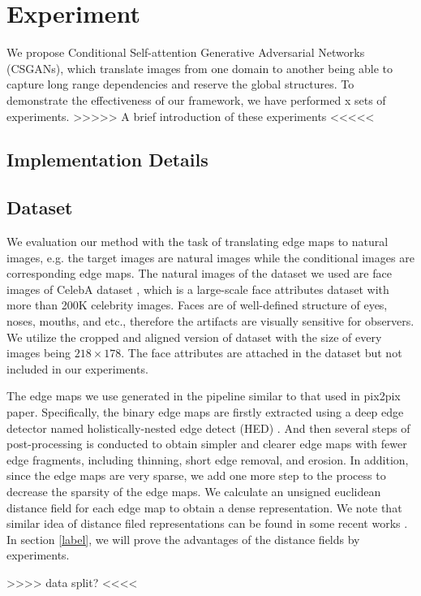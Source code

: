 \section{Experiment}
We propose Conditional Self-attention Generative Adversarial Networks (CSGANs), which translate images from one domain to another being able to capture long range dependencies and reserve the global structures. To demonstrate the effectiveness of our framework, we have performed x sets of experiments. >>>>> A brief introduction of these experiments <<<<< 
\subsection{Implementation Details}
\subsection{Dataset}
We evaluation our method with the task of translating edge maps to natural images, e.g. the target images are natural images while the conditional images are corresponding edge maps. The natural images of the dataset we used are face images of CelebA dataset \cite{CelebA}, which  is a large-scale face attributes dataset with more than 200K celebrity images. Faces are of well-defined structure of eyes, noses, mouths, and etc., therefore the artifacts are visually sensitive for observers. We utilize the cropped and aligned version of dataset with the size of every images being $218\times 178$. The face attributes are attached in the dataset but not included in our experiments. 

The edge maps we use generated in the pipeline similar to that used in pix2pix paper. Specifically, the binary edge maps are firstly extracted using a deep edge detector named holistically-nested edge detect (HED) \cite{HED}. And then several steps of post-processing is conducted to obtain simpler and clearer edge maps with fewer edge fragments, including thinning, short edge removal, and erosion. In addition, since the edge maps are very sparse, we add one more step to the process to decrease the sparsity of the edge maps. We calculate an unsigned euclidean distance field for each edge map to obtain a dense representation. We note that similar idea of distance filed representations can be found in some recent works \cite{xx, xx, SketchyGANs}. In section \ref{label}, we will prove the advantages of the distance fields by experiments.

>>>> data split? <<<<
%
%
